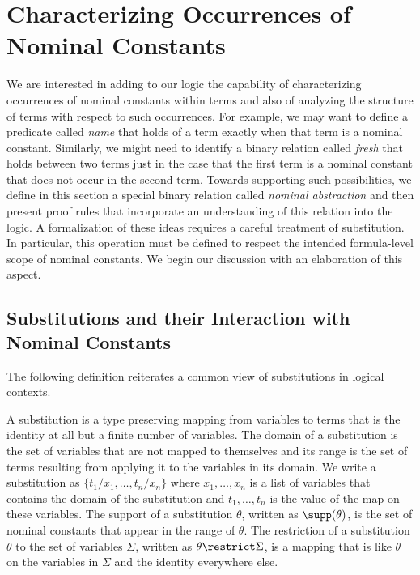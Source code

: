 \section{Characterizing Occurrences of Nominal Constants}
\label{sec:nominal-abstraction}

We are interested in adding to our logic the capability of
characterizing occurrences of nominal constants within terms and also
of analyzing the structure of terms with respect to such
occurrences. For example, we may want to define a predicate called
{\em name} that holds of a term exactly when that term is a nominal
constant. Similarly, we might need to identify a binary relation
called {\em fresh} that holds between two terms just in the case that
the first term is a nominal constant that does not occur in the second
term. Towards supporting such possibilities, we define in this section
a special binary relation called {\it nominal abstraction} and then
present proof rules that incorporate an understanding of this relation
into the logic. A formalization of these ideas requires a careful
treatment of substitution. In particular, this operation must be
defined to respect the intended formula-level scope of nominal
constants. We begin our discussion with an elaboration of this aspect.

\subsection{Substitutions and their Interaction with Nominal Constants}

The following definition reiterates a common view of substitutions
in logical contexts.

\begin{definition}\label{subst}
A substitution is a type preserving mapping from variables
to terms that is the identity at all but a finite number of variables.
The domain of a substitution is the set of variables that are
not mapped to themselves and its range is the
set of terms resulting from applying it to the variables in its
domain.  We write a substitution as $\{t_1/x_1,\ldots,t_n/x_n\}$
where $x_1,\ldots,x_n$ is a list of variables that contains the
domain of the substitution and $t_1,\ldots,t_n$ is the value of the
map on these variables. The support of a substitution $\theta$,
written as $\supp(\theta)$, is the set of nominal constants that appear in
the range of $\theta$. The restriction of a substitution $\theta$ to
the set of variables $\Sigma$, written as $\theta \restrict
\Sigma$, is a mapping that is like $\theta$ on the variables in
$\Sigma$ and the identity everywhere else.
\end{definition}

